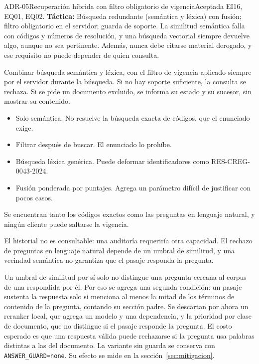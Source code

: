 \begin{adr}{ADR-05}{Recuperación híbrida con filtro obligatorio de vigencia}{Aceptada}
 EI16, EQ01, EQ02. \textbf{Táctica:} Búsqueda redundante (semántica y léxica) con fusión; filtro obligatorio en el servidor; guarda de soporte.
La similitud semántica falla con códigos y números de resolución, y una búsqueda vectorial siempre devuelve algo, aunque no sea pertinente. Además, nunca debe citarse material
derogado, y ese requisito no puede depender de quien consulta.

Combinar búsqueda semántica y léxica, con el filtro de vigencia aplicado siempre por el servidor durante la búsqueda. Si no hay soporte suficiente, la consulta se rechaza. Si se pide un documento excluido, se informa su estado y su sucesor, sin mostrar su contenido.

\begin{itemize}
  \item Solo semántica. No resuelve la búsqueda exacta de códigos, que el enunciado exige.
  \item Filtrar después de buscar. El enunciado lo prohíbe.
  \item Búsqueda léxica genérica. Puede deformar identificadores como RES-CREG-0043-2024.
  \item Fusión ponderada por puntajes. Agrega un parámetro difícil de justificar con pocos casos.
\end{itemize}

Se encuentran tanto los códigos exactos como las preguntas en lenguaje natural, y ningún cliente puede saltarse la vigencia.

El historial no es consultable: una auditoría requeriría otra capacidad. El rechazo de preguntas en lenguaje natural depende de un umbral de similitud, y una vecindad semántica no garantiza que el pasaje responda la pregunta.

Un umbral de similitud por sí solo no distingue una pregunta cercana al corpus de una respondida por él. Por eso se agrega una segunda condición: un pasaje sustenta la respuesta solo si menciona al menos la mitad de los términos de contenido de la pregunta, contando su sección padre. Se descartan por ahora un reranker local, que agrega un modelo y una dependencia, y la prioridad por clase de documento, que no distingue si el pasaje responde la pregunta. El costo esperado es que una respuesta válida puede rechazarse si la pregunta usa palabras distintas a las del documento. La variante sin guarda se conserva con \texttt{ANSWER\_GUARD=none}. Su efecto se mide en la sección~\ref{sec:mitigacion}.
\end{adr}

